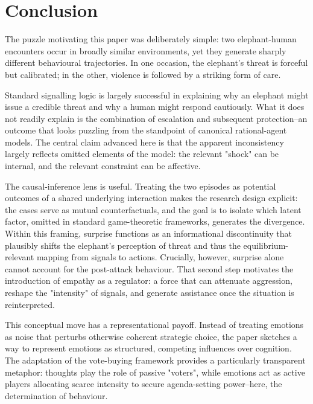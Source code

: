
\section*{Conclusion}
The puzzle motivating this paper was deliberately simple: two elephant-human encounters occur in broadly similar environments, yet they generate sharply different behavioural trajectories. In one occasion, the elephant's threat is forceful but calibrated; in the other, violence is followed by a striking form of care.

\vspace*{1em}
Standard signalling logic is largely successful in explaining why an elephant might issue a credible threat and why a human might respond cautiously. What it does not readily explain is the combination of escalation and subsequent protection--an outcome that looks puzzling from the standpoint of canonical rational-agent models. The central claim advanced here is that the apparent inconsistency largely reflects omitted elements of the model: the relevant "shock" can be internal, and the relevant constraint can be affective.

\vspace*{1em}
The causal-inference lens is useful. Treating the two episodes as potential outcomes of a shared underlying interaction makes the research design explicit: the cases serve as mutual counterfactuals, and the goal is to isolate which latent factor, omitted in standard game-theoretic frameworks, generates the divergence. Within this framing, surprise functions as an informational discontinuity that plausibly shifts the elephant's perception of threat and thus the equilibrium-relevant mapping from signals to actions. Crucially, however, surprise alone cannot account for the post-attack behaviour. That second step motivates the introduction of empathy as a regulator: a force that can attenuate aggression, reshape the "intensity" of signals, and generate assistance once the situation is reinterpreted.

\vspace*{1em}
This conceptual move has a representational payoff. Instead of treating emotions as noise that perturbs otherwise coherent strategic choice, the paper sketches a way to represent emotions as structured, competing influences over cognition. The adaptation of the vote-buying framework provides a particularly transparent metaphor: thoughts play the role of passive "voters", while emotions act as active players allocating scarce intensity to secure agenda-setting power--here, the determination of behaviour. 

